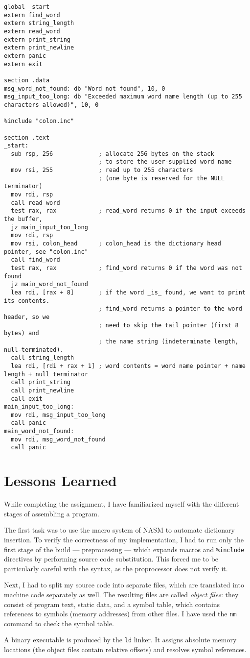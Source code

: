 \documentclass[12pt,a4paper]{report}
\begin{document}
\begin{lstlisting}[basicstyle=\scriptsize]
global _start
extern find_word
extern string_length
extern read_word
extern print_string
extern print_newline
extern panic
extern exit

section .data
msg_word_not_found: db "Word not found", 10, 0
msg_input_too_long: db "Exceeded maximum word name length (up to 255 characters allowed)", 10, 0

%include "colon.inc"

section .text
_start:
  sub rsp, 256             ; allocate 256 bytes on the stack
                           ; to store the user-supplied word name
  mov rsi, 255             ; read up to 255 characters
                           ; (one byte is reserved for the NULL terminator)
  mov rdi, rsp
  call read_word           
  test rax, rax            ; read_word returns 0 if the input exceeds the buffer,
  jz main_input_too_long  
  mov rdi, rsp
  mov rsi, colon_head      ; colon_head is the dictionary head pointer, see "colon.inc"
  call find_word
  test rax, rax            ; find_word returns 0 if the word was not found
  jz main_word_not_found  
  lea rdi, [rax + 8]       ; if the word _is_ found, we want to print its contents.
                           ; find_word returns a pointer to the word header, so we
                           ; need to skip the tail pointer (first 8 bytes) and
                           ; the name string (indeterminate length, null-terminated).
  call string_length
  lea rdi, [rdi + rax + 1] ; word contents = word name pointer + name length + null terminator
  call print_string
  call print_newline
  call exit
main_input_too_long:
  mov rdi, msg_input_too_long
  call panic
main_word_not_found:
  mov rdi, msg_word_not_found
  call panic
\end{lstlisting}



\section*{Lessons Learned}

While completing the assignment, I have familiarized myself with the different
stages of assembling a program.

The first task was to use the macro system of NASM to automate dictionary insertion.
To verify the correctness of my implementation, I had to run only the first stage of
the build — preprocessing — which expands macros and \texttt{\%include} directives by
performing source code substitution. This forced me to be particularly careful
with the syntax, as the proprocessor does not verify it.

Next, I had to split my source code into separate files, which are translated
into machine code separately as well. The resulting files are called \textit{object files}:
they consist of program text, static data, and a symbol table, which contains
references to symbols (memory addresses) from other files. I have used the \texttt{nm}
command to check the symbol table.

A binary executable is produced by the \texttt{ld} linker. It assigns absolute memory
locations (the object files contain relative offsets) and resolves symbol references.
\end{document}
